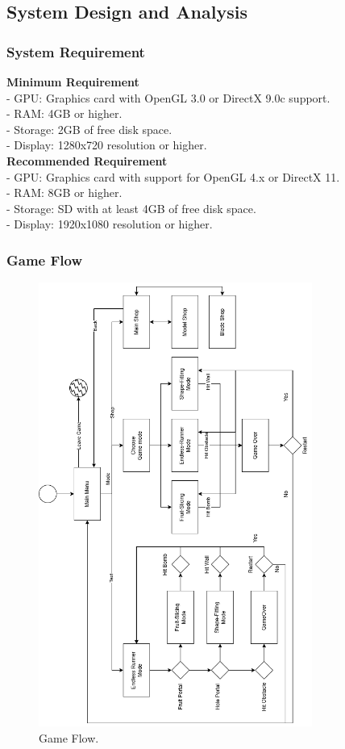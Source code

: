 \documentclass[12pt]{article}
\begin{document}
\subsection{System Design and Analysis}
\subsubsection{System Requirement}
\hspace*{1.5em}\textbf{Minimum Requirement}\\[5pt]
-	GPU: Graphics card with OpenGL 3.0 or DirectX 9.0c support.\\
-	RAM: 4GB or higher.\\
-	Storage: 2GB of free disk space.\\
-	Display: 1280x720 resolution or higher.\\

\textbf{Recommended Requirement}\\[5pt]
-	GPU: Graphics card with support for OpenGL 4.x or DirectX 11.\\
-	RAM: 8GB or higher.\\
-	Storage: SD with at least 4GB of free disk space.\\
-	Display: 1920x1080 resolution or higher.

\subsubsection{Game Flow}
\begin{figure}[H]
    \centering
    \includegraphics[width=0.8\textwidth]{flow4.drawio.png}
    \caption{Game Flow.}
\end{figure}
\clearpage
\end{document}
